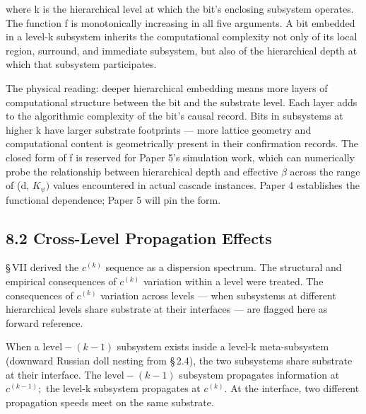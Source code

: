 \documentclass[11pt,oneside]{report}
\theoremstyle{definition}
\theoremstyle{remark}
\begin{document}
where k is the hierarchical level at which the bit's enclosing subsystem
operates. The function f is monotonically increasing in all five
arguments. A bit embedded in a level-k subsystem inherits the
computational complexity not only of its local region, surround, and
immediate subsystem, but also of the hierarchical depth at which that
subsystem participates.

The physical reading: deeper hierarchical embedding means more layers of
computational structure between the bit and the substrate level. Each
layer adds to the algorithmic complexity of the bit's causal record.
Bits in subsystems at higher k have larger substrate footprints --- more
lattice geometry and computational content is geometrically present in
their confirmation records. The closed form of f is reserved for Paper
5's simulation work, which can numerically probe the relationship
between hierarchical depth and effective \ensuremath{\beta} across the range of (d, \ensuremath{K_{\psi})}
values encountered in actual cascade instances. Paper 4 establishes the
functional dependence; Paper 5 will pin the form.

\subsection*{8.2 Cross-Level Propagation Effects}

\S\,VII derived the \ensuremath{c^{(k)}} sequence as a dispersion spectrum. The
structural and empirical consequences of \ensuremath{c^{(k)}} variation within a
level were treated. The consequences of \ensuremath{c^{(k)}} variation across levels
--- when subsystems at different hierarchical levels share substrate at
their interfaces --- are flagged here as forward reference.

When a \ensuremath{\text{level}-(k-1)} subsystem exists inside a level-k meta-subsystem
(downward Russian doll nesting from \S\,2.4), the two subsystems share
substrate at their interface. The \ensuremath{\text{level}-(k-1)} subsystem propagates
information at \ensuremath{c^{(k-1)};} the level-k subsystem propagates at \ensuremath{c^{(k)}.}
At the interface, two different propagation speeds meet on the same
substrate.
\end{document}
